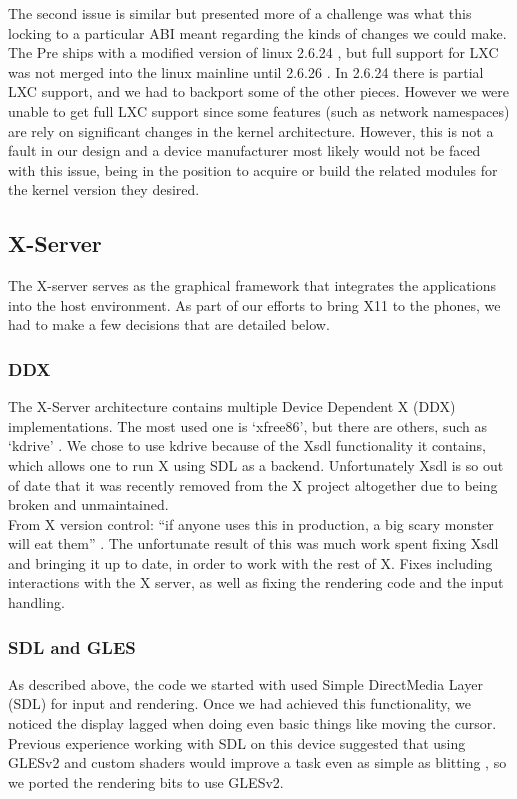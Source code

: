     The second issue is similar but presented more of a challenge was what this locking to a particular ABI meant regarding the kinds of changes we could make.  The Pre ships with a modified version of linux 2.6.24 \cite{pre_kernel}, but full support for LXC was not merged into the linux mainline until 2.6.26 \cite{lxc_kernel}.  In 2.6.24 there is partial LXC support, and we had to backport some of the other pieces.  However we were unable to get full LXC support since some features (such as network namespaces) are rely on significant changes in the kernel architecture.  However, this is not a fault in our design and a device manufacturer most likely would not be faced with this issue, being in the position to acquire or build the related modules for the kernel version they desired. \\


\subsection{X-Server}

The X-server serves as the graphical framework that integrates the applications into the host environment.  As part of our efforts to bring X11 to the phones, we had to make a few decisions that are detailed below. \\

\subsubsection{DDX}
The X-Server architecture contains multiple Device Dependent X (DDX) implementations.  The most used one is `xfree86', but there are others, such as `kdrive' \cite{x_glossary}.  We chose to use kdrive because of the Xsdl functionality it contains, which allows one to run X using SDL as a backend.  Unfortunately Xsdl is so out of date that it was recently removed from the X project altogether due to being broken and unmaintained. \\

From X version control: ``if anyone uses this in production, a big scary monster will eat them'' \cite{x_quote}.  The unfortunate result of this was much work spent fixing Xsdl and bringing it up to date, in order to work with the rest of X.  Fixes including interactions with the X server, as well as fixing the rendering code and the input handling. \\

\subsubsection{SDL and GLES}
As described above, the code we started with  used Simple DirectMedia Layer (SDL) \cite{sdl} for input and rendering.  Once we had achieved this functionality, we noticed the display lagged when doing even basic things like moving the cursor.  Previous experience working with SDL on this device suggested that using GLESv2 \cite{gles} and custom shaders would improve a task even as simple as blitting , so we ported the rendering bits to use GLESv2. \\

